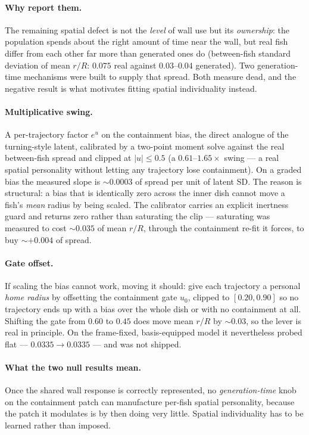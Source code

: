 \paragraph{Why report them.} The remaining spatial defect is not the \emph{level} of wall use but
its \emph{ownership}: the population spends about the right amount of time near the wall, but real
fish differ from each other far more than generated ones do (between-fish standard deviation of
mean $r/R$: $0.075$ real against $0.03$--$0.04$ generated). Two generation-time mechanisms were
built to supply that spread. Both measure dead, and the negative result is what motivates fitting
spatial individuality instead.

\paragraph{Multiplicative swing.} A per-trajectory factor $e^{u}$ on the containment bias, the
direct analogue of the turning-style latent, calibrated by a two-point moment solve against the
real between-fish spread and clipped at $|u|\le0.5$ (a $0.61$--$1.65\times$ swing --- a real spatial
personality without letting any trajectory lose containment). On a graded bias the measured slope
is ${\sim}0.0003$ of spread per unit of latent SD. The reason is structural: a bias that is
identically zero across the inner dish cannot move a fish's \emph{mean} radius by being scaled. The
calibrator carries an explicit inertness guard and returns zero rather than saturating the clip ---
saturating was measured to cost ${\sim}0.035$ of mean $r/R$, through the containment re-fit it
forces, to buy ${\sim}{+}0.004$ of spread.

\paragraph{Gate offset.} If scaling the bias cannot work, moving it should: give each trajectory a
personal \emph{home radius} by offsetting the containment gate $u_0$, clipped to $[0.20,0.90]$ so no
trajectory ends up with a bias over the whole dish or with no containment at all. Shifting the gate
from $0.60$ to $0.45$ does move mean $r/R$ by ${\sim}0.03$, so the lever is real in principle. On
the frame-fixed, basis-equipped model it nevertheless probed flat --- $0.0335\to0.0335$ --- and was
not shipped.

\paragraph{What the two null results mean.} Once the shared wall response is correctly
represented, no \emph{generation-time} knob on the containment patch can manufacture per-fish
spatial personality, because the patch it modulates is by then doing very little. Spatial
individuality has to be learned rather than imposed.


